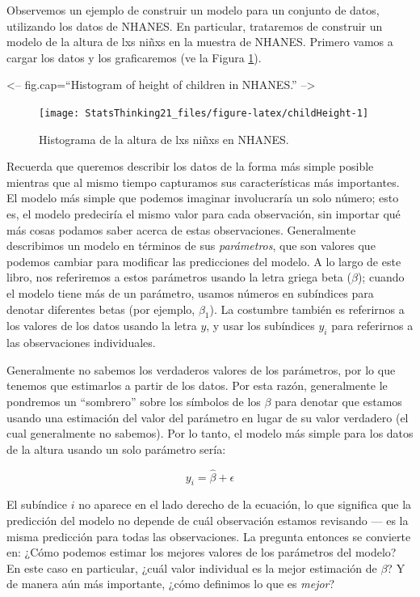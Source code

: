 \documentclass[
  12pt,
]{book}
\begin{document}
Observemos un ejemplo de construir un modelo para un conjunto de datos, utilizando los datos de NHANES. En particular, trataremos de construir un modelo de la altura de lxs niñxs en la muestra de NHANES. Primero vamos a cargar los datos y los graficaremos (ve la Figura \ref{fig:childHeight}).

\textless-- fig.cap=``Histogram of height of children in NHANES.'' --\textgreater{}

\begin{figure}
\texttt{[image: StatsThinking21\_files/figure-latex/childHeight-1]} \caption{Histograma de la altura de lxs niñxs en NHANES.}\label{fig:childHeight}
\end{figure}

Recuerda que queremos describir los datos de la forma más simple posible mientras que al mismo tiempo capturamos sus características más importantes. El modelo más simple que podemos imaginar involucraría un solo número; esto es, el modelo predeciría el mismo valor para cada observación, sin importar qué más cosas podamos saber acerca de estas observaciones. Generalmente describimos un modelo en términos de sus \emph{parámetros}, que son valores que podemos cambiar para modificar las predicciones del modelo. A lo largo de este libro, nos referiremos a estos parámetros usando la letra griega beta (\(\beta\)); cuando el modelo tiene más de un parámetro, usamos números en subíndices para denotar diferentes betas (por ejemplo, \(\beta_1\)). La costumbre también es referirnos a los valores de los datos usando la letra \(y\), y usar los subíndices \(y_i\) para referirnos a las observaciones individuales.

Generalmente no sabemos los verdaderos valores de los parámetros, por lo que tenemos que estimarlos a partir de los datos. Por esta razón, generalmente le pondremos un ``sombrero'' sobre los símbolos de los \(\beta\) para denotar que estamos usando una estimación del valor del parámetro en lugar de su valor verdadero (el cual generalmente no sabemos). Por lo tanto, el modelo más simple para los datos de la altura usando un solo parámetro sería:

\[
y_i = \hat{\beta} + \epsilon
\]

El subíndice \(i\) no aparece en el lado derecho de la ecuación, lo que significa que la predicción del modelo no depende de cuál observación estamos revisando --- es la misma predicción para todas las observaciones. La pregunta entonces se convierte en: ¿Cómo podemos estimar los mejores valores de los parámetros del modelo? En este caso en particular, ¿cuál valor individual es la mejor estimación de \(\beta\)? Y de manera aún más importante, ¿cómo definimos lo que es \emph{mejor}?
\end{document}
